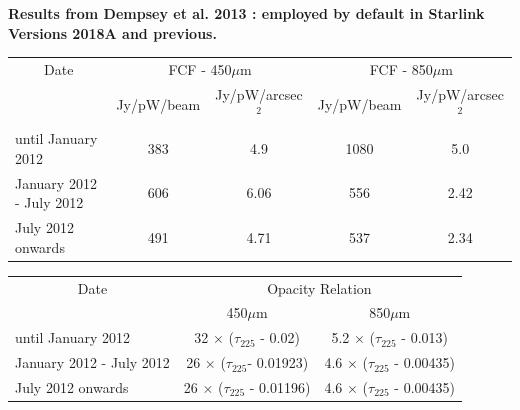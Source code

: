\textbf{Results from Dempsey et al. 2013 \cite{dempsey12}: employed by
default in Starlink Versions 2018A and previous.}\\
\begin{table}[h!]
\begin{center}
\begin{tabular}{|l|c|c|c|c|}
 \hline
 \multicolumn{1}{|c|}{Date} &
 \multicolumn{2}{c|}{FCF - 450$\mu$m} &
 \multicolumn{2}{c|}{FCF - 850$\mu$m} \\
\cline{2-5}
& Jy/pW/beam &Jy/pW/arcsec$^2$ & Jy/pW/beam &Jy/pW/arcsec$^2$ \\
 \hline
until January 2012 &383  & 4.9&1080 &5.0 \\
January 2012 - July 2012&606&6.06 &556 &2.42 \\
July 2012 onwards&491 &4.71 &537 &2.34 \\
\hline
\end{tabular}
\end{center}
\end{table}
\vspace{-2mm}
\begin{table}[h!]
\begin{center}
\begin{tabular}{|l|c|c|}
 \hline
 \multicolumn{1}{|c}{Date} & \multicolumn{2}{|c|}{Opacity Relation}  \\ \cline{2-3}
                           & 450$\mu$m  & 850$\mu$m \\ \hline
until January 2012       & 32 $\times$ ($\tau_{225}$ - 0.02)    & 5.2 $\times$ ($\tau_{225}$ - 0.013)  \\
January 2012 - July 2012 & 26 $\times$ ($\tau_{225}$- 0.01923)  & 4.6 $\times$ ($\tau_{225}$ - 0.00435)  \\
July 2012 onwards        & 26 $\times$ ($\tau_{225}$ - 0.01196) & 4.6 $\times$ ($\tau_{225}$ - 0.00435)  \\
\hline
\end{tabular}
\end{center}
\end{table}
